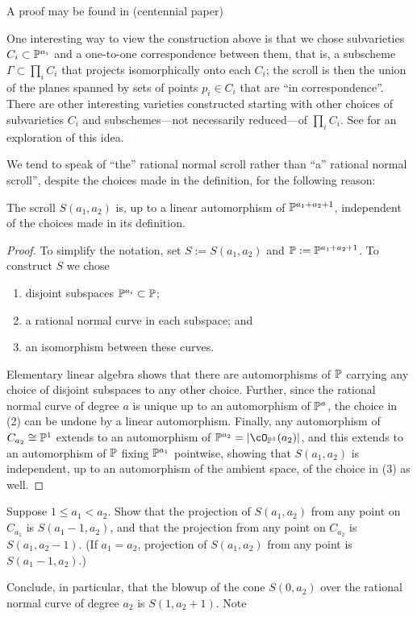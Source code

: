 A proof may be found in \cite{****} (centennial paper)

One interesting way to view the construction above is that we chose subvarieties $C_{i}\subset \PP^{a_{i}}$ and a one-to-one correspondence between them, that is, a subscheme
$\Gamma\subset \prod_{i}C_{i}$ that projects isomorphically onto each $C_{i}$; the scroll is then the
union of the planes spanned by sets of points $p_{i}\in C_{i}$ that are ``in correspondence''. There are other interesting varieties constructed starting with other choices of subvarieties $C_{i}$ and subschemes---not necessarily reduced---of $\prod_{i}C_{i}$. See \cite{Eisenbud-Sammartano} for an exploration of this idea.

We tend to speak of ``the'' rational normal scroll rather than ``a'' rational normal scroll'', despite the choices made in the definition, for the following reason:

\begin{proposition}\label{uniqueness of scrolls}
The scroll $S(a_1,a_2)$ is, up to a linear automorphism of $\PP^{a_1+a_2+1}$, independent of the choices made in its
 definition. 
\end{proposition}
\begin{proof} 
To simplify the notation, set $S := S(a_{1}, a_{2})$ and $\PP := \PP^{a_1+a_2+1}$.
To construct $S$ we chose 
\begin{enumerate}
 \item disjoint subspaces $\PP^{a_i}\subset \PP$;
 \item a rational normal curve in each subspace; and
 \item an isomorphism between these curves.
\end{enumerate}
Elementary linear algebra shows that there are automorphisms of $\PP$ carrying any choice of disjoint subspaces to any other choice. Further, since the rational normal curve of degree $a$ is unique up to an automorphism of $\PP^{a}$, the choice in (2) can be undone by a linear automorphism. Finally, any automorphism of $C_{a_{2}}\cong \PP^{1}$ extends to an automorphism of $\PP^{a_{2}} = |\cO_{\PP^{1}}(a_{2})|$, and this extends to an automorphism of $\PP$ fixing $\PP^{a_{1}}$ pointwise,
showing that $S(a_{1}, a_{2})$ is independent, up to an automorphism of the ambient space, of the choice in (3)  as well.
\end{proof}

\begin{exercise}\label{special projections}
Suppose $1\leq a_1 < a_2$. Show that the projection of $S(a_1,a_2)$ from any point on $C_{a_1}$ is 
$S(a_1-1, a_2)$, and that the projection from any point on $C_{a_2}$ is $S(a_1, a_2-1)$. (If $a_1 = a_2$, projection of $S(a_1,a_2)$ from any point is $S(a_1-1, a_2)$.)

Conclude, in particular, that the blowup of the cone $S(0,a_2)$ over the rational normal curve of degree $a_2$ is $S(1,a_2+1)$. Note 
\end{exercise}


